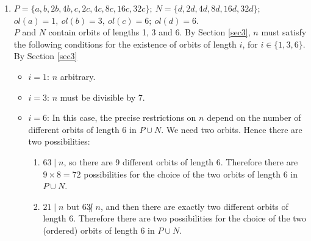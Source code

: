 {{{\begin{enumerate}
	 By Theorems \ref{theor1} and \ref{th1} we get that for every odd  
	 $d \geq 1$ there are 
	 two distinct equivalence classes in $CW(31m,16)$ with $olp(P)=5^2$ 
	 and $olp(N)=1^15^1$. They are
	 \begin{itemize}   
	   \item
	   $ \widetilde{w_1}(x)=-1-x^{m}-x^{2m}+x^{3m}-x^{4m}+x^{6m}+x^{7m}-x^{8m}+x^{12m}+x^{14m}-x^{16m}+x^{17m}+x^{19m}+x^{24m}+x^{25m}+x^{28m}, $
	   \item
	   $ \widetilde{w_2}(x)=-1-x^{m}-x^{2m}-x^{4m}+x^{5m}-x^{8m}+x^{9m}+x^{10m}+x^{15m}-x^{16m}+x^{18m}+x^{20m}+x^{23m}+x^{27m}+x^{29m}+x^{30m}. $
	 \end{itemize}

{ \ }\\

  \item  $ P=\{a,b,2b,4b,c,2c,4c,8c,16c,32c\}; \  N=\{d,2d,4d,8d,16d,32d\} $; \\  
	 $ ol(a)=1, \ ol(b)=3, \  ol(c)=6; \  ol(d)=6 $.\\
	 
	 $P$ and $N$ contain orbits of lengths 1, 3 and 6.
	 By Section \ref{sec3}, $n$ must satisfy the following conditions  for 
	 the existence of orbits of length $i$, for $i \in \{1,3,6\}$.
	 By Section \ref{sec3}
	 \begin{itemize}
	     \item \underline{$i=1$}: $n$ arbitrary.
	     \item \underline{$i=3$}: $n$ must be divisible by 7.
	     \item \underline{$i=6$}: In this case, the precise restrictions on $n$ depend on the number
	     of different orbits of length 6 in $P \cup N$. We need two   
	     orbits. Hence there are two possibilities: 
	     \begin{enumerate}
	\item $63 \mid n$, so there are 9 different orbits of length 6.
	     Therefore there are $9 \times 8=72$ possibilities for the choice of the 
	     two orbits of length 6 in $P \cup N$. 
	\item $21 \mid n$ but $63 \not| \; n$, and then there are exactly 
	     two different orbits of length 6.
	     Therefore there are two possibilities for the choice of the two 
	     (ordered) orbits of length 6 in $P \cup N$.
	     
	     \end{enumerate}
	 

\end{itemize}
\end{enumerate}}}}
